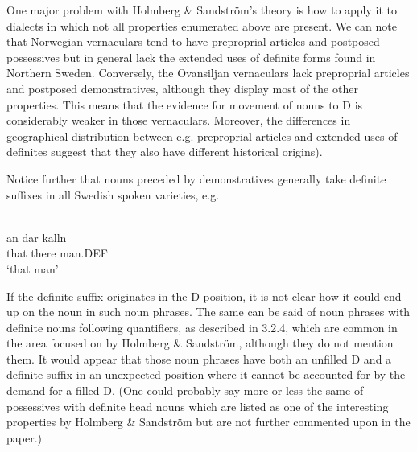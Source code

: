 
One major problem with Holmberg \& Sandström’s theory is how to apply it to dialects in which not all properties enumerated above are present. We can note that Norwegian vernaculars tend to have preproprial articles and postposed possessives but in general lack the extended uses of definite forms found in Northern Sweden. Conversely, the Ovansiljan vernaculars lack preproprial articles and postposed demonstratives, although they display most of the other properties. This means that the evidence for movement of nouns to D is considerably weaker in those vernaculars. Moreover, the differences in geographical distribution between e.g. preproprial articles and extended uses of definites suggest that they also have different historical origins). 


Notice further that nouns preceded by demonstratives generally take definite suffixes in all Swedish spoken varieties, e.g.


\ea \label{} 
\\
\gll an  dar  kalln\\
that  there  man.DEF\\
\glt ‘that man’

\z

If the definite suffix originates in the D position, it is not clear how it could end up on the noun in such noun phrases. The same can be said of noun phrases with definite nouns following quantifiers, as described in 3.2.4, which are common in the area focused on by Holmberg \& Sandström, although they do not mention them. It would appear that those noun phrases have both an unfilled D and a definite suffix in an unexpected position where it cannot be accounted for by the demand for a filled D. (One could probably say more or less the same of possessives with definite head nouns which are listed as one of the interesting properties by Holmberg \& Sandström but are not further commented upon in the paper.)



